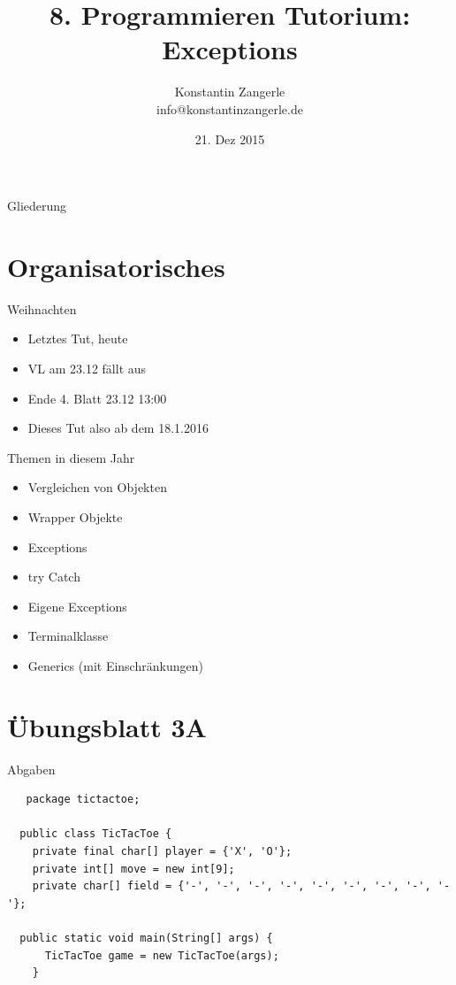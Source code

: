 \documentclass[18pt]{beamer}
\title[Programmieren Tutorium]{8. Programmieren Tutorium:\texorpdfstring{\\}{} Exceptions}
\author{Konstantin Zangerle \texorpdfstring{\\}{} info@konstantinzangerle.de}
\date{21. Dez 2015}
\begin{document}

\begin{frame}
\titlepage
\end{frame}

\begin{frame}{Gliederung}
\tableofcontents
\end{frame}

\section{Organisatorisches}

\begin{frame}{Weihnachten}
 \begin{itemize}
  \item Letztes Tut, heute
  \item VL am 23.12 fällt aus
  \item Ende 4. Blatt 23.12 13:00
  \item Dieses Tut also ab dem 18.1.2016
 \end{itemize}

\end{frame}

\begin{frame}{Themen in diesem Jahr}
\begin{itemize}
 \item Vergleichen von Objekten
 \item Wrapper Objekte
 \item Exceptions
 \item try Catch
 \item Eigene Exceptions
 \item Terminalklasse
 \item Generics (mit Einschränkungen)
\end{itemize}

 
\end{frame}

\section{Übungsblatt 3A}
\begin{frame}[fragile]{Abgaben}
 \begin{lstlisting}
   package tictactoe;
  
  public class TicTacToe {
    private final char[] player = {'X', 'O'};
    private int[] move = new int[9];
    private char[] field = {'-', '-', '-', '-', '-', '-', '-', '-', '-'};
    
  public static void main(String[] args) {
      TicTacToe game = new TicTacToe(args);
    }
 \end{lstlisting}

\end{frame}
\end{document}
